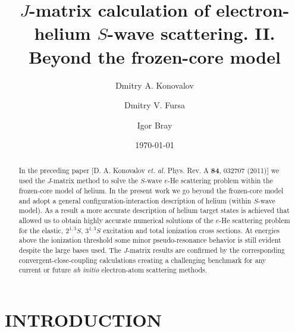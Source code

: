 \documentclass[aip
, pra
, showpacs
, aps
, twocolumn
, groupedaddress
, floatfix
]{revtex4}
\begin{document}
\title {$J$-matrix calculation of electron-helium $S$-wave scattering. II. Beyond the frozen-core model}

\author{Dmitry A. Konovalov}

\author{Dmitry V. Fursa}

\author{Igor Bray}



\date{\today}

\begin{abstract}
In the preceding paper  [D. A. Konovalov {\em et. al.} Phys. Rev. A {\bf 84}, 032707 (2011)] we used
the $J$-matrix method to solve  the $S$-wave $e$-He scattering problem within the frozen-core model of helium.
In the present work we go beyond the frozen-core model and adopt a general configuration-interaction description of helium (within $S$-wave model).
As a result a more accurate description of helium target states is achieved that allowed us to obtain highly
accurate numerical solutions of the $e$-He scattering problem
for the elastic, $2^{1,3}S$, $3^{1,3}S$ excitation and total ionization cross sections.
At energies above the ionization threshold some minor pseudo-resonance behavior is still evident despite the large bases used.
The $J$-matrix results are confirmed by the corresponding convergent-close-coupling calculations creating a challenging benchmark
for any current or future {\it ab initio} electron-atom scattering methods.



\end{abstract}

\maketitle



\section{INTRODUCTION}
\end{document}
